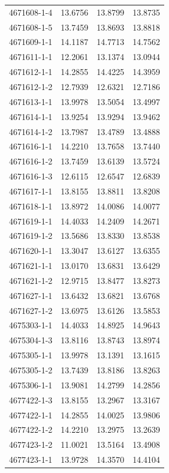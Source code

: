 \begin{longtable}{lrrr}
4671608-1-4 & 13.6756 & 13.8799 & 13.8735 \\
4671608-1-5 & 13.7459 & 13.8693 & 13.8818 \\
4671609-1-1 & 14.1187 & 14.7713 & 14.7562 \\
4671611-1-1 & 12.2061 & 13.1374 & 13.0944 \\
4671612-1-1 & 14.2855 & 14.4225 & 14.3959 \\
4671612-1-2 & 12.7939 & 12.6321 & 12.7186 \\
4671613-1-1 & 13.9978 & 13.5054 & 13.4997 \\
4671614-1-1 & 13.9254 & 13.9294 & 13.9462 \\
4671614-1-2 & 13.7987 & 13.4789 & 13.4888 \\
4671616-1-1 & 14.2210 & 13.7658 & 13.7440 \\
4671616-1-2 & 13.7459 & 13.6139 & 13.5724 \\
4671616-1-3 & 12.6115 & 12.6547 & 12.6839 \\
4671617-1-1 & 13.8155 & 13.8811 & 13.8208 \\
4671618-1-1 & 13.8972 & 14.0086 & 14.0077 \\
4671619-1-1 & 14.4033 & 14.2409 & 14.2671 \\
4671619-1-2 & 13.5686 & 13.8330 & 13.8538 \\
4671620-1-1 & 13.3047 & 13.6127 & 13.6355 \\
4671621-1-1 & 13.0170 & 13.6831 & 13.6429 \\
4671621-1-2 & 12.9715 & 13.8477 & 13.8273 \\
4671627-1-1 & 13.6432 & 13.6821 & 13.6768 \\
4671627-1-2 & 13.6975 & 13.6126 & 13.5853 \\
4675303-1-1 & 14.4033 & 14.8925 & 14.9643 \\
4675304-1-3 & 13.8116 & 13.8743 & 13.8974 \\
4675305-1-1 & 13.9978 & 13.1391 & 13.1615 \\
4675305-1-2 & 13.7439 & 13.8186 & 13.8263 \\
4675306-1-1 & 13.9081 & 14.2799 & 14.2856 \\
4677422-1-3 & 13.8155 & 13.2967 & 13.3167 \\
4677422-1-1 & 14.2855 & 14.0025 & 13.9806 \\
4677422-1-2 & 14.2210 & 13.2975 & 13.2639 \\
4677423-1-2 & 11.0021 & 13.5164 & 13.4908 \\
4677423-1-1 & 13.9728 & 14.3570 & 14.4104 \\

\end{longtable}
